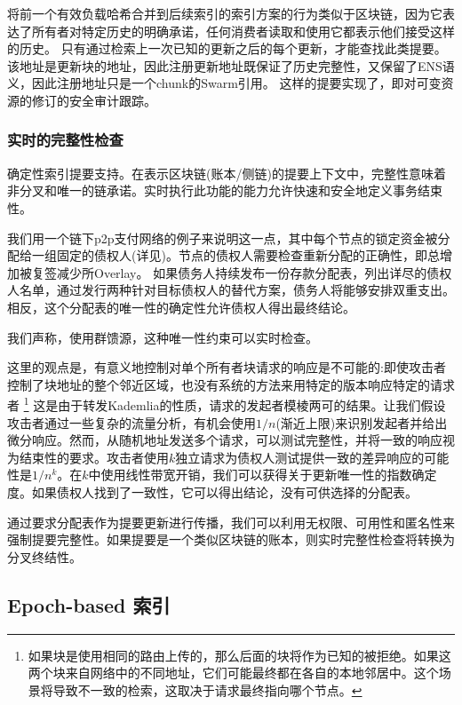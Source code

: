 将前一个有效负载哈希合并到后续索引的索引方案的行为类似于区块链，因为它表达了所有者对特定历史的明确承诺，任何消费者读取和使用它都表示他们接受这样的历史。
只有通过检索上一次已知的更新之后的每个更新，才能查找此类提要。该地址是更新块的地址，因此注册更新地址既保证了历史完整性，又保留了ENS语义，因此注册地址只是一个chunk的Swarm引用。
这样的提要实现了，即对可变资源的修订的安全审计跟踪。 

\subsubsection{实时的完整性检查}

确定性索引提要支持。在表示区块链(账本/侧链)的提要上下文中，完整性意味着非分叉和唯一的链承诺。实时执行此功能的能力允许快速和安全地定义事务结束性。

我们用一个链下p2p支付网络的例子来说明这一点，其中每个节点的锁定资金被分配给一组固定的债权人(详见\cite{ethersphere2019swap})。节点的债权人需要检查重新分配的正确性，即总增加被复签减少所Overlay。
如果债务人持续发布一份存款分配表，列出详尽的债权人名单，通过发行两种针对目标债权人的替代方案，债务人将能够安排双重支出。相反，这个分配表的唯一性的确定性允许债权人得出最终结论。

我们声称，使用群馈源，这种唯一性约束可以实时检查。

这里的观点是，有意义地控制对单个所有者块请求的响应是不可能的:即使攻击者控制了块地址的整个邻近区域，也没有系统的方法来用特定的版本响应特定的请求者
%
\footnote{如果块是使用相同的路由上传的，那么后面的块将作为已知的被拒绝。如果这两个块来自网络中的不同地址，它们可能最终都在各自的本地邻居中。这个场景将导致不一致的检索，这取决于请求最终指向哪个节点。}
%
这是由于转发Kademlia的性质，请求的发起者模棱两可的结果。让我们假设攻击者通过一些复杂的流量分析，有机会使用$1/n$(渐近上限)来识别发起者并给出微分响应。然而，从随机地址发送多个请求，可以测试完整性，并将一致的响应视为结束性的要求。攻击者使用$k$独立请求为债权人测试提供一致的差异响应的可能性是$1/n^k$。在$k$中使用线性带宽开销，我们可以获得关于更新唯一性的指数确定度。如果债权人找到了一致性，它可以得出结论，没有可供选择的分配表。


通过要求分配表作为提要更新进行传播，我们可以利用无权限、可用性和匿名性来强制提要完整性。如果提要是一个类似区块链的账本，则实时完整性检查将转换为分叉终结性。 


\subsection{Epoch-based
索引\statusyellow}\label{sec:epoch-based-feeds}

